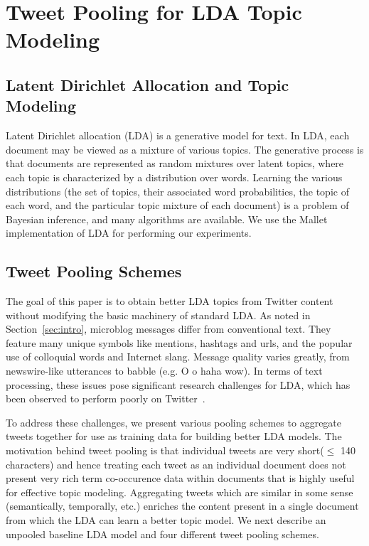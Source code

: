 \documentclass[10pt,a5paper,twoside]{article}
\begin{document}

\section{Tweet Pooling for LDA Topic Modeling}

\label{sec:pooling}

\subsection{Latent Dirichlet Allocation and Topic Modeling}

\label{subsec:lda}

Latent Dirichlet allocation (LDA) \cite{blei03} is a generative model
for text. In LDA, each document may be viewed as a mixture of various
topics.  The generative process is that documents are
represented as random mixtures over latent topics, where each topic is
characterized by a distribution over words.  Learning the various
distributions (the set of topics, their associated word probabilities,
the topic of each word, and the particular topic mixture of each
document) is a problem of Bayesian inference, and many algorithms are
available.  We use the Mallet \cite{mallet} implementation of LDA for
performing our experiments.

\subsection{Tweet Pooling Schemes}

The goal of this paper is to obtain better LDA topics from Twitter
content without modifying the basic machinery of standard LDA.  As
noted in Section~\ref{sec:intro}, microblog messages differ from
conventional text. They feature many unique symbols like mentions,
hashtags and urls, and the popular use of colloquial words and
Internet slang. Message quality varies greatly, from newswire-like
utterances to babble (e.g. O o haha wow). In terms of text processing,
these issues pose significant research challenges for LDA, which has
been observed to perform poorly on Twitter~\cite{wayne}.

To address these challenges, we present various pooling schemes to
aggregate tweets together for use as training data for building better
LDA models. The motivation behind tweet pooling is that individual
tweets are very short($\leq$ 140 characters) and hence treating each
tweet as an individual document does not present very rich term
co-occurence data within documents that is highly useful for effective
topic modeling.  Aggregating tweets which are similar in some sense
(semantically, temporally, etc.) enriches the content present in a
single document from which the LDA can learn a better topic model.  We
next describe an unpooled baseline LDA model and four different tweet
pooling schemes.
\end{document}
